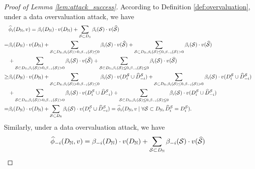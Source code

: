 \begin{proof}[Proof of Lemma \ref{lem:attack_success}]
	According to Definition \ref{def:overvaluation}, under a data overvaluation attack, we have
	\begin{align*}
		& \widehat{\phi}_{i}(D_{\mathbb{N}}, v) = \beta_i(D_{\mathbb{N}}) \cdot v(D_{\mathbb{N}}) + \sum_{\mathcal{S}\subset D_{\mathbb{N}}} \beta_i(\mathcal{S}) \cdot v(\widehat{\mathcal{S}}) \\
		= & \beta_i(D_{\mathbb{N}}) \cdot v(D_{\mathbb{N}}) + \sum_{\mathcal{S}\subset D_{\mathbb{N}}, \beta_i(\mathcal{S}) > 0, \beta_{-i}(\mathcal{S}) \leq 0} \beta_i(\mathcal{S}) \cdot v(\widehat{\mathcal{S}}) + \sum_{\mathcal{S}\subset D_{\mathbb{N}}, \beta_i(\mathcal{S}) \leq 0, \beta_{-i}(\mathcal{S}) > 0} \beta_i(\mathcal{S}) \cdot v(\widehat{\mathcal{S}}) \\
		& + \sum_{\mathcal{S}\subset D_{\mathbb{N}}, \beta_i(\mathcal{S}) > 0, \beta_{-i}(\mathcal{S}) > 0} \beta_i(\mathcal{S}) \cdot v(\widehat{\mathcal{S}}) + \sum_{\mathcal{S}\subset D_{\mathbb{N}}, \beta_i(\mathcal{S}) \leq 0, \beta_{-i}(\mathcal{S}) \leq 0} \beta_i(\mathcal{S}) \cdot v(\widehat{\mathcal{S}})\\
		\geq & \beta_i(D_{\mathbb{N}}) \cdot v(D_{\mathbb{N}}) + \sum_{\mathcal{S}\subset D_{\mathbb{N}}, \beta_i(\mathcal{S}) > 0, \beta_{-i}(\mathcal{S}) \leq 0} \beta_i(\mathcal{S}) \cdot v(D^{\mathcal{S}}_{i}\cup \widehat{D}^{\mathcal{S}}_{-i}) + \sum_{\mathcal{S}\subset D_{\mathbb{N}}, \beta_i(\mathcal{S}) \leq 0, \beta_{-i}(\mathcal{S}) > 0} \beta_i(\mathcal{S}) \cdot v(D^{\mathcal{S}}_{i}\cup \widehat{D}^{\mathcal{S}}_{-i}) \\
		& + \sum_{\mathcal{S}\subset D_{\mathbb{N}}, \beta_i(\mathcal{S}) > 0, \beta_{-i}(\mathcal{S}) > 0} \beta_i(\mathcal{S}) \cdot v(D^{\mathcal{S}}_{i}\cup \widehat{D}^{\mathcal{S}}_{-i}) + \sum_{\mathcal{S}\subset D_{\mathbb{N}}, \beta_i(\mathcal{S}) \leq 0, \beta_{-i}(\mathcal{S}) \leq 0} \beta_i(\mathcal{S}) \cdot v(D^{\mathcal{S}}_{i}\cup \widehat{D}^{\mathcal{S}}_{-i})\\
		= & \beta_i(D_{\mathbb{N}}) \cdot v(D_{\mathbb{N}}) + \sum_{\mathcal{S}\subset D_{\mathbb{N}}} \beta_i(\mathcal{S}) \cdot v(D^{\mathcal{S}}_{i} \cup \widehat{D}^{\mathcal{S}}_{-i}) = \widehat{\phi}_{i}(D_{\mathbb{N}}, v \mid \forall \mathcal{S} \subset D_{\mathbb{N}}, \widehat{D}^{\mathcal{S}}_{i} =  D^{\mathcal{S}}_{i}).
	\end{align*}
	Similarly, under a data overvaluation attack, we have
	\begin{align*}
		& \empiricaldatavalue_{-i}(\granddataset, v) = \beta_{-i}(\granddataset) \cdot v(\granddataset) + \sum_{\datasubset\subset \granddataset} \beta_{-i}(\datasubset) \cdot v(\reportedsubset) \\

\end{align*}
\end{proof}

